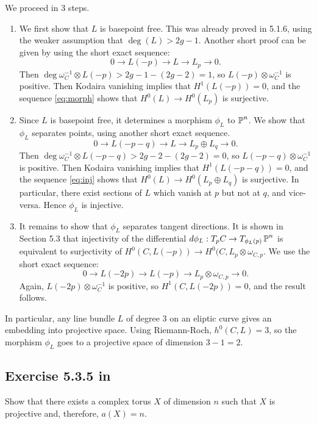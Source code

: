 \documentclass{article}
\begin{document}
We proceed in 3 steps.
\begin{enumerate}
\item We first show that $L$ is basepoint free. This was already proved in 5.1.6, using the weaker assumption that
$\deg(L) > 2g-1$. Another short proof can be given by using the short exact sequence:
\begin{equation}
\label{eq:morph}
	0 \to L(-p) \to L \to L_p \to 0.
\end{equation}
Then $\deg \omega_C^{-1} \otimes L(-p) > 2g-1 - (2g-2) = 1$, so $L(-p) \otimes \omega_C^{-1}$ is positive. Then Kodaira vanishing
implies that $H^1(L(-p)) = 0$, and the sequence \ref{eq:morph} shows that $H^0(L) \to H^0(L_p)$ is surjective.

\item Since $L$ is basepoint free, it determines a morphism $\phi_L$ to $\operatorname{\mathbb{P}}^n$. We show that $\phi_L$ separates points,
using another short exact sequence.
\begin{equation}
\label{eq:inj}
	0 \to L(-p-q) \to L \to L_{p} \oplus L_{q} \to 0.
\end{equation}
Then $\deg \omega_C^{-1} \otimes L(-p-q) > 2g-2 - (2g-2) = 0$, so $L(-p-q) \otimes \omega_C^{-1}$ is positive. Then Kodaira vanishing
implies that $H^1(L(-p-q)) = 0$, and the sequence \ref{eq:inj} shows that $H^0(L) \to H^0(L_p\oplus L_q)$ is surjective.
In particular, there exist sections of $L$ which vanish at $p$ but not at $q$, and vice-versa. Hence $\phi_L$ is injective.

\item It remains to show that $\phi_L$ separates tangent directions. It is shown in Section 5.3 that injectivity of
the differential $d\phi_L : T_pC \to T_{\phi_L(p)}\operatorname{\mathbb{P}}^n$ is equivalent to surjectivity of $H^0(C,L(-p)) \to H^0(C,
L_p\otimes \omega_{C,p}$. We use the short exact sequence:
\begin{equation}
\label{eq:immer}
	0 \to L(-2p) \to L(-p) \to L_{p} \otimes \omega_{C,p} \to 0.
\end{equation}
Again, $L(-2p) \otimes \omega_C^{-1}$ is positive, so $H^1(C,L(-2p)) = 0$, and the result follows.
\end{enumerate}

In particular, any line bundle $L$ of degree 3 on an eliptic curve gives an embedding into projective space. Using
Riemann-Roch, $h^0(C,L) = 3$, so the morphism $\phi_L$ goes to a projective space of dimension $3-1 = 2$.


\subsection*{Exercise 5.3.5 in \cite{Huy}}
 Show that there exists a complex torus $X$ of dimension $n$ such that $X$ is
projective and, therefore, $a(X) = n$.
\vspace{3mm}
\end{document}

